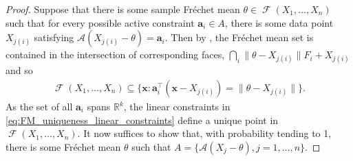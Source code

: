 \documentclass[10pt,a4paper]{amsart}
\newcommand{\A}{\mathcal{A}}
\DeclareMathOperator{\FMset}{\mathcal{F}}
\newcommand{\R}{\mathbb{R}}
\newcommand{\T}{\intercal}
\newcommand{\sample}{ X_1,\dots, X_n}
\renewcommand{\vec}[1]{\mathbf{#1}}
\begin{document}
	\begin{proof}
		Suppose that there is some sample Fr\'echet mean $\theta \in \FMset(\sample)$ such that for every possible active constraint $\vec a_i \in A$, there is some data point $X_{j(i)}$ satisfying $\A(X_{j(i)}-\theta) = \vec a_i$. Then by , the Fr\'echet mean set is contained in the intersection of corresponding faces, $\bigcap_i \|\theta-X_{j(i)}\| F_i+X_{j(i)}$ and so
		\begin{align}
			\FMset(X_1,\dots,X_n) \subseteq \{ \vec x: \vec a_i^{\T}(\vec x-X_{j(i)}) = \|\theta-X_{j(i)}\| \} \label{eq:FM_uniqueness_linear_constraints}.
		\end{align}
		As the set of all $\vec a_i$ spans $\R^k$, the linear constraints in \ref{eq:FM_uniqueness_linear_constraints} define a unique point in $\FMset(X_1, \dots, X_n)$. It now suffices to show that, with probability tending to 1, there is some Fr\'echet mean $\theta$ such that $A = \{ \A(X_j - \theta), j=1,\dots,n \}$.
		

\end{proof}
\end{document}
